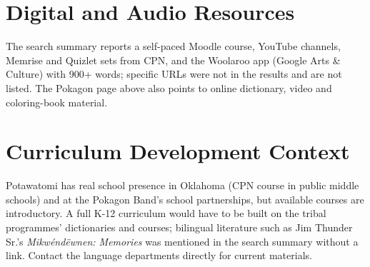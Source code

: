 \documentclass[12pt]{article}
\begin{document}
\section{Digital and Audio Resources}
The search summary reports a self-paced Moodle course, YouTube channels, Memrise and Quizlet sets from CPN, and the Woolaroo app (Google Arts \& Culture) with 900+ words; specific URLs were not in the results and are not listed. The Pokagon page above also points to online dictionary, video and coloring-book material.

\section{Curriculum Development Context}
Potawatomi has real school presence in Oklahoma (CPN course in public middle schools) and at the Pokagon Band's school partnerships, but available courses are introductory. A full K-12 curriculum would have to be built on the tribal programmes' dictionaries and courses; bilingual literature such as Jim Thunder Sr.'s \emph{Mikw\'end\"ewnen: Memories} was mentioned in the search summary without a link. Contact the language departments directly for current materials.
\end{document}
